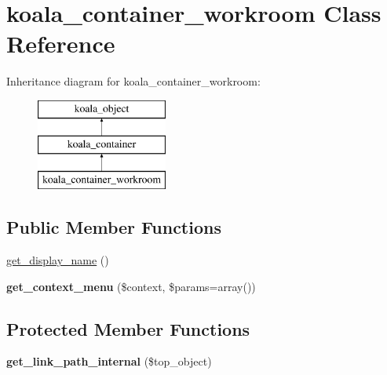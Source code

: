 \hypertarget{classkoala__container__workroom}{
\section{koala\_\-container\_\-workroom Class Reference}
\label{classkoala__container__workroom}
}
Inheritance diagram for koala\_\-container\_\-workroom:\begin{figure}[H]
\begin{center}
\leavevmode
\includegraphics[height=3.000000cm]{classkoala__container__workroom}
\end{center}
\end{figure}
\subsection*{Public Member Functions}
\begin{DoxyCompactItemize}
\item 
\hyperlink{classkoala__container__workroom_a590d8539b4edcfff7f2aa609166e38e5}{get\_\-display\_\-name} ()
\item 
\hypertarget{classkoala__container__workroom_a034ad74b82cda50ab4fc214aaadcde5a}{
{\bfseries get\_\-context\_\-menu} (\$context, \$params=array())}
\label{classkoala__container__workroom_a034ad74b82cda50ab4fc214aaadcde5a}

\end{DoxyCompactItemize}
\subsection*{Protected Member Functions}
\begin{DoxyCompactItemize}
\item 
\hypertarget{classkoala__container__workroom_adf54815c370a870b13261b53a3a62bfb}{
{\bfseries get\_\-link\_\-path\_\-internal} (\$top\_\-object)}
\label{classkoala__container__workroom_adf54815c370a870b13261b53a3a62bfb}

\end{DoxyCompactItemize}


